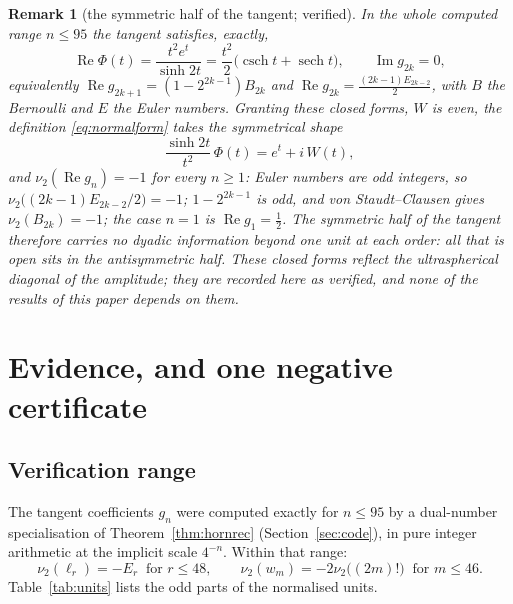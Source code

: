 \documentclass[10pt,a4paper]{amsart}
\newtheorem{remark}[theorem]{Remark}
\begin{document}
\begin{remark}[the symmetric half of the tangent; verified]\label{rem:identityR}
In the whole computed range $n\le95$ the tangent satisfies, exactly,
\[
  \operatorname{Re}\Phi(t)=\frac{t^2e^t}{\sinh2t} =\frac{t^2}2\bigl(\operatorname{csch}t+\operatorname{sech}t\bigr),
  \qquad \operatorname{Im}g_{2k}=0 ,
\]
equivalently $\operatorname{Re}g_{2k+1}=(1-2^{2k-1})B_{2k}$ and $\operatorname{Re}g_{2k}=\frac{(2k-1)E_{2k-2}}2$, with $B$ the Bernoulli and $E$ the Euler numbers.  Granting these closed forms, $W$ is even, the definition \eqref{eq:normalform} takes the symmetrical shape
\[
  \frac{\sinh2t}{t^2}\,\Phi(t)=e^t+i\,W(t),
\]
and $\nu_2(\operatorname{Re}g_n)=-1$ for every $n\ge1$: Euler numbers are odd integers, so $\nu_2\bigl((2k-1)E_{2k-2}/2\bigr)=-1$; $1-2^{2k-1}$ is odd, and von Staudt--Clausen gives $\nu_2(B_{2k})=-1$; the case $n=1$ is $\operatorname{Re}g_1=\frac12$.  The symmetric half of the tangent therefore carries no dyadic information beyond one unit at each order: all that is open sits in the antisymmetric half.  These closed forms reflect the ultraspherical diagonal of the amplitude; they are recorded here as verified, and \emph{none of the results of this paper depends on them}.
\end{remark}

\section{Evidence, and one negative certificate}\label{sec:evidence}

\subsection{Verification range}

The tangent coefficients $g_n$ were computed exactly for $n\le95$ by a dual-number specialisation of Theorem~\ref{thm:hornrec} (Section~\ref{sec:code}), in pure integer arithmetic at the implicit scale $4^{-n}$.  Within that range:
\[
  \nu_2(\ell_r)=-E_r\ \text{ for }r\le48,\qquad
  \nu_2(w_m)=-2\nu_2\bigl((2m)!\bigr)\ \text{ for }m\le46 .
\]
Table~\ref{tab:units} lists the odd parts of the normalised units.
\end{document}
